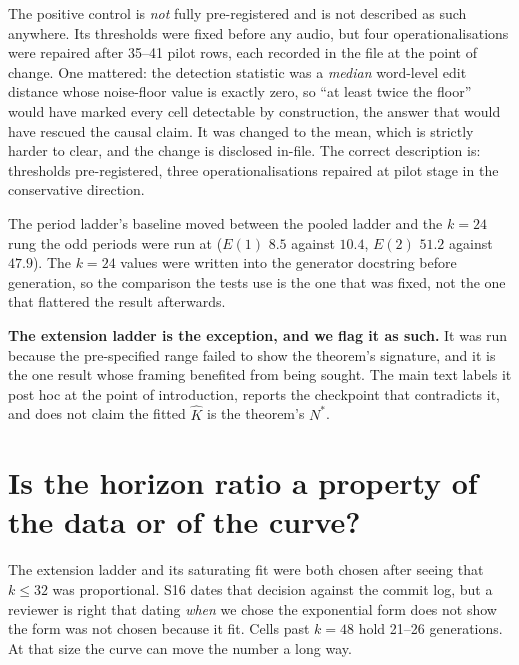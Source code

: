 \documentclass[11pt]{article}
\begin{document}
The positive control is \emph{not} fully pre-registered and is not described as
such anywhere. Its thresholds were fixed before any audio, but four
operationalisations were repaired after 35--41 pilot rows, each recorded in the
file at the point of change. One mattered: the detection statistic was a
\emph{median} word-level edit distance whose noise-floor value is exactly zero,
so ``at least twice the floor'' would have marked every cell detectable by
construction, the answer that would have rescued the causal claim. It was
changed to the mean, which is strictly harder to clear, and the change is
disclosed in-file. The correct description is: thresholds pre-registered, three
operationalisations repaired at pilot stage in the conservative direction.

The period ladder's baseline moved between the pooled ladder and the $k{=}24$
rung the odd periods were run at ($E(1)$ $8.5$ against $10.4$, $E(2)$ $51.2$
against $47.9$). The $k{=}24$ values were written into the generator docstring
before generation, so the comparison the tests use is the one that was fixed,
not the one that flattered the result afterwards.

\noindent\textbf{The extension ladder is the exception, and we flag it as such.}
It was run because the pre-specified range failed to show the theorem's
signature, and it is the one result whose framing benefited from being sought.
The main text labels it post hoc at the point of introduction, reports the
checkpoint that contradicts it, and does not claim the fitted $\hat K$ is the
theorem's $N^\ast$.

\section{Is the horizon ratio a property of the data or of the curve?}

The extension ladder and its saturating fit were both chosen after seeing that
$k\le32$ was proportional. S16 dates that decision against the commit log, but a
reviewer is right that dating \emph{when} we chose the exponential form does not
show the form was not chosen because it fit. Cells past $k=48$ hold 21--26
generations. At that size the curve can move the number a long way.
\end{document}
